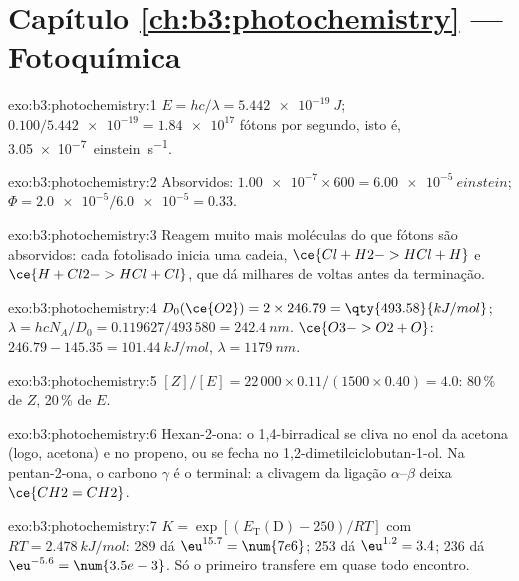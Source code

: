 \section*{Capítulo \ref{ch:b3:photochemistry} --- Fotoquímica}

\begin{solution}{exo:b3:photochemistry:1}
$E = hc/\lambda = \qty{5.442e-19}{J}$; $0.100/\num{5.442e-19} = \num{1.84e17}$ fótons por segundo, isto é,
\qty{3.05e-7}{einstein.s^{-1}}.
\end{solution}

\begin{solution}{exo:b3:photochemistry:2}
Absorvidos: $\num{1.00e-7} \times 600 = \qty{6.00e-5}{einstein}$; $\Phi = \num{2.0e-5}/\num{6.0e-5} = 0.33$.
\end{solution}

\begin{solution}{exo:b3:photochemistry:3}
Reagem muito mais moléculas do que fótons são absorvidos: cada  fotolisado inicia
uma cadeia, $\ce{Cl + H2 -> HCl + H}$ e $\ce{H + Cl2 -> HCl + Cl}$, que dá milhares de voltas antes
da terminação.
\end{solution}

\begin{solution}{exo:b3:photochemistry:4}
$D_0(\ce{O2}) = 2 \times 246.79 = \qty{493.58}{kJ/mol}$; $\lambda = hcN_A/D_0 = 0.119627/493\,580 =
\qty{242.4}{nm}$. $\ce{O3 -> O2 + O}$: $246.79 - 145.35 = \qty{101.44}{kJ/mol}$, $\lambda = \qty{1179}{nm}$.
\end{solution}

\begin{solution}{exo:b3:photochemistry:5}
$[Z]/[E] = 22\,000 \times 0.11/(1500 \times 0.40) = 4.0$: 80\,\% de $Z$, 20\,\% de $E$.
\end{solution}

\begin{solution}{exo:b3:photochemistry:6}
Hexan-2-ona: o 1,4-birradical se cliva no enol da acetona (logo, acetona) e no
propeno, ou se fecha no 1,2-dimetilciclobutan-1-ol. Na pentan-2-ona, o carbono $\gamma$
é o  terminal: a clivagem da ligação $\alpha$--$\beta$ deixa $\ce{CH2=CH2}$.
\end{solution}

\begin{solution}{exo:b3:photochemistry:7}
$K = \exp[(E_{\mathrm T}(\mathrm D) - 250)/RT]$ com $RT = \qty{2.478}{kJ/mol}$: 289 dá $\eu^{15.7} = \num{7e6}$;
253 dá $\eu^{1.2} = 3.4$; 236 dá $\eu^{-5.6} = \num{3.5e-3}$. Só o primeiro transfere em quase
todo encontro.
\end{solution}

